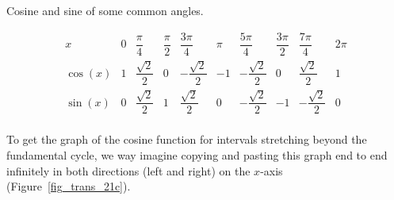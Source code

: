 \begin{table}[H]
\caption{Cosine and sine of some common angles.}
\label{tab_trans_2bis}
\renewcommand{\arraystretch}{2.5}
\[ \begin{array}{r||rrrrrrrrr}  
 x & 0 & \dfrac{\pi}{4}& \dfrac{\pi}{2}  & \dfrac{3\pi}{4}  &\pi &\dfrac{5\pi}{4}  &\dfrac{3\pi}{2}  &\dfrac{7\pi}{4}  &2\pi\\ \hline
\cos(x) & 1 
  & \dfrac{\sqrt{2}}{2} & 0 &-\dfrac{\sqrt{2}}{2} &-1 &-\dfrac{\sqrt{2}}{2}&0& \dfrac{\sqrt{2}}{2}  & 1\\[0.2cm]
  \sin(x)&0&\dfrac{\sqrt{2}}{2}&1&\dfrac{\sqrt{2}}{2}&0&-\dfrac{\sqrt{2}}{2}&-1&-\dfrac{\sqrt{2}}{2}&0\\
\end{array} \] 
\renewcommand{\arraystretch}{1}
\end{table}

To get the graph of the cosine function for intervals stretching beyond the fundamental cycle, we way imagine copying and pasting this graph end to end infinitely in both directions (left and right) on the $x$-axis (Figure~\ref{fig_trans_21c}).

